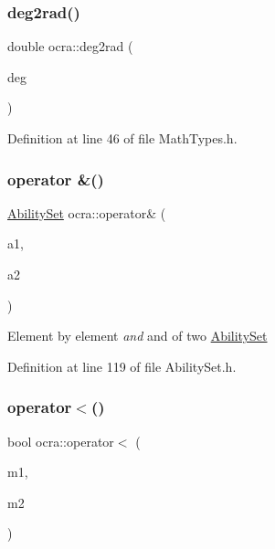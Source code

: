 \hypertarget{namespaceocra_aa770b1747e9ddd05361e291ad6e598e5}{}\label{namespaceocra_aa770b1747e9ddd05361e291ad6e598e5} 
\subsubsection{\texorpdfstring{deg2rad()}{deg2rad()}}
{\footnotesize\ttfamily double ocra\+::deg2rad (\begin{DoxyParamCaption}\item[{const double}]{deg }\end{DoxyParamCaption})\hspace{0.3cm}{\ttfamily [inline]}}



Definition at line 46 of file Math\+Types.\+h.

\hypertarget{namespaceocra_aeb699d061b8c3d896eb0c1ce0e789817}{}\label{namespaceocra_aeb699d061b8c3d896eb0c1ce0e789817} 
\subsubsection{\texorpdfstring{operator \&()}{operator \&()}}
{\footnotesize\ttfamily \hyperlink{classocra_1_1AbilitySet}{Ability\+Set} ocra\+::operator\& (\begin{DoxyParamCaption}\item[{const \hyperlink{classocra_1_1AbilitySet}{Ability\+Set}}]{a1,  }\item[{const \hyperlink{classocra_1_1AbilitySet}{Ability\+Set}}]{a2 }\end{DoxyParamCaption})\hspace{0.3cm}{\ttfamily [inline]}}

Element by element {\itshape and} and  of two \hyperlink{classocra_1_1AbilitySet}{Ability\+Set} 

Definition at line 119 of file Ability\+Set.\+h.

\hypertarget{namespaceocra_a604361203754e7d30fc3720d29f1c414}{}\label{namespaceocra_a604361203754e7d30fc3720d29f1c414} 
\subsubsection{\texorpdfstring{operator$<$()}{operator<()}}
{\footnotesize\ttfamily bool ocra\+::operator$<$ (\begin{DoxyParamCaption}\item[{const \hyperlink{structocra_1_1FSQPConstraintManager_1_1Mapping}{F\+S\+Q\+P\+Constraint\+Manager\+::\+Mapping} \&}]{m1,  }\item[{const \hyperlink{structocra_1_1FSQPConstraintManager_1_1Mapping}{F\+S\+Q\+P\+Constraint\+Manager\+::\+Mapping} \&}]{m2 }\end{DoxyParamCaption})}




